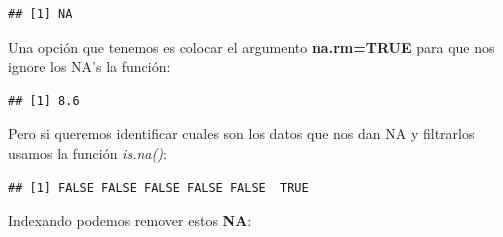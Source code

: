 \documentclass[
]{book}
\newenvironment{Shaded}{\begin{snugshade}}{\end{snugshade}}
\newcommand{\AttributeTok}[1]{\textcolor[rgb]{0.13,0.29,0.53}{#1}}
\newcommand{\ConstantTok}[1]{\textcolor[rgb]{0.56,0.35,0.01}{#1}}
\newcommand{\DecValTok}[1]{\textcolor[rgb]{0.00,0.00,0.81}{#1}}
\newcommand{\FunctionTok}[1]{\textcolor[rgb]{0.13,0.29,0.53}{\textbf{#1}}}
\newcommand{\NormalTok}[1]{#1}
\newcommand{\OtherTok}[1]{\textcolor[rgb]{0.56,0.35,0.01}{#1}}
\newcommand{\SpecialCharTok}[1]{\textcolor[rgb]{0.81,0.36,0.00}{\textbf{#1}}}
\newcommand{\StringTok}[1]{\textcolor[rgb]{0.31,0.60,0.02}{#1}}
\begin{document}
\begin{Shaded}
\end{Shaded}

\begin{verbatim}
## [1] NA
\end{verbatim}

\hfill\break
Una opción que tenemos es colocar el argumento \textbf{na.rm=TRUE} para que nos ignore los NA's la función:

\begin{Shaded}
\end{Shaded}

\begin{verbatim}
## [1] 8.6
\end{verbatim}

\hfill\break
Pero si queremos identificar cuales son los datos que nos dan NA y filtrarlos usamos la función \emph{is.na()}:

\begin{Shaded}
\end{Shaded}

\begin{verbatim}
## [1] FALSE FALSE FALSE FALSE FALSE  TRUE
\end{verbatim}

\hfill\break
Indexando podemos remover estos \textbf{NA}:
\end{document}
